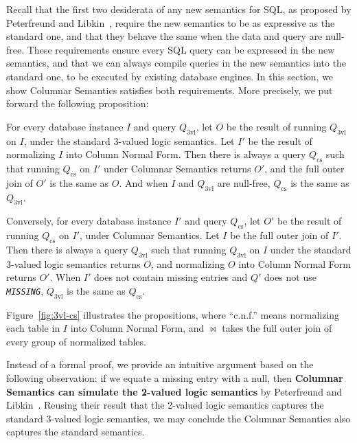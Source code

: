 \documentclass[sigconf,nonacm]{acmart}
\begin{document}
Recall that the first two desiderata of any new semantics for SQL, 
 as proposed by Peterfreund and Libkin~\cite{DBLP:conf/pods/LibkinP23},
 require the new semantics to be as expressive as the standard one,
 and that they behave the same when the data and query are null-free.
These requirements ensure every SQL query can be expressed in the 
 new semantics, 
 and that we can always compile queries in the new semantics into the standard one,
 to be executed by existing database engines.
In this section, we show Columnar Semantics satisfies both requirements.
More precisely, we put forward the following proposition:
%
\begin{proposition}
\label{prop:cs-eq-3vl}
For every database instance $I$ and query $Q_\text{3vl}$,
 let $O$ be the result of running $Q_\text{3vl}$ on $I$, 
 under the standard 3-valued logic semantics.
Let $I'$ be the result of normalizing $I$ into Column Normal Form.
Then there is always a query $Q_\text{cs}$ such that
 running $Q_\text{cs}$ on $I'$ under Columnar Semantics returns $O'$,
 and the full outer join of $O'$ is the same as $O$.
And when $I$ and $Q_\text{3vl}$ are null-free, $Q_\text{cs}$ 
 is the same as $Q_\text{3vl}$.
\end{proposition}
%
\begin{proposition}
\label{prop:3vl-eq-cs}
Conversely, for every database instance $I'$ and query $Q_\text{cs}$,
 let $O'$ be the result of running $Q_\text{cs}$ on $I'$, 
 under Columnar Semantics.
Let $I$ be the full outer join of $I'$.
Then there is always a query $Q_\text{3vl}$ such that
 running $Q_\text{3vl}$ on $I$ under the standard 3-valued logic semantics returns $O$,
 and normalizing $O$ into Column Normal Form returns $O'$.
When $I'$ does not contain missing entries and $Q'$ does not use {\em \lstinline|MISSING|},
 $Q_\text{3vl}$ is the same as $Q_\text{cs}$.
\end{proposition}
%
Figure~\ref{fig:3vl-cs} illustrates the propositions, 
 where ``c.n.f.'' means normalizing each table in $I$ into Column Normal Form,
 and $\Join$ takes the full outer join of every group of normalized tables.

Instead of a formal proof, 
 we provide an intuitive argument based on the following observation:
 if we equate a missing entry with a null,
 then \textbf{Columnar Semantics can simulate the 2-valued logic semantics} 
 by Peterfreund and Libkin~\cite{DBLP:conf/pods/LibkinP23}.
Reusing their result that the 2-valued logic semantics
 captures the standard 3-valued logic semantics,
 we may conclude the Columnar Semantics also captures the standard semantics.
\end{document}
